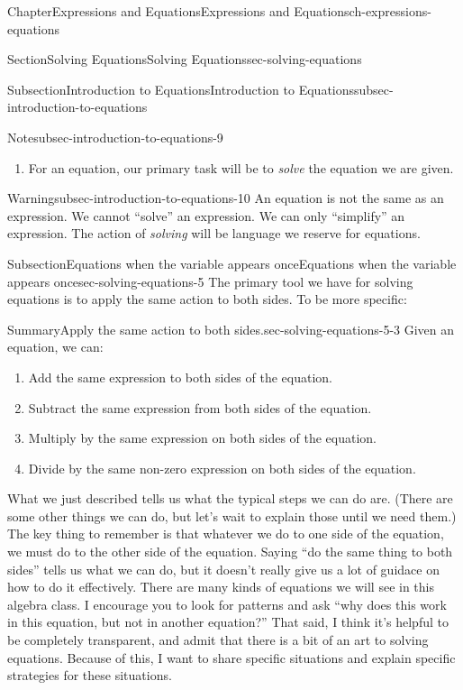 \documentclass[twoside,11pt,]{book}
\numberwithin{equation}{chapter}
\begin{document}
\begin{chapterptx}{Chapter}{Expressions and Equations}{}{Expressions and Equations}{}{}{ch-expressions-equations}
\begin{sectionptx}{Section}{Solving Equations}{}{Solving Equations}{}{}{sec-solving-equations}
\begin{subsectionptx}{Subsection}{Introduction to Equations}{}{Introduction to Equations}{}{}{subsec-introduction-to-equations}
\begin{note}{Note}{}{subsec-introduction-to-equations-9}
\begin{enumerate}
\item{}For an equation, our primary task will be to \emph{solve} the equation we are given.%
\end{enumerate}
%
\end{note}
\begin{warning}{Warning}{}{subsec-introduction-to-equations-10}%
An equation is not the same as an expression. We cannot ``solve'' an expression. We can only ``simplify'' an expression. The action of \emph{solving} will be language we reserve for equations.%
\end{warning}
\end{subsectionptx}
%
%
\typeout{************************************************}
\typeout{************************************************}
%
\begin{subsectionptx}{Subsection}{Equations when the variable appears once}{}{Equations when the variable appears once}{}{}{sec-solving-equations-5}
The primary tool we have for solving equations is to apply the same action to both sides. To be more specific:%
\begin{assemblage}{Summary}{Apply the same action to both sides.}{sec-solving-equations-5-3}%
Given an equation, we can:%
\begin{enumerate}
\item{}Add the same expression to both sides of the equation.%
\item{}Subtract the same expression from both sides of the equation.%
\item{}Multiply by the same expression on both sides of the equation.%
\item{}Divide by the same non-zero expression on both sides of the equation.%
\end{enumerate}
%
\end{assemblage}
What we just described tells us what the typical steps we can do are. (There are some other things we can do, but let's wait to explain those until we need them.) The key thing to remember is that whatever we do to one side of the equation, we must do to the other side of the equation. Saying ``do the same thing to both sides'' tells us what we can do, but it doesn't really give us a lot of guidace on how to do it effectively. There are many kinds of equations we will see in this algebra class. I encourage you to look for patterns and ask ``why does this work in this equation, but not in another equation?'' That said, I think it's helpful to be completely transparent, and admit that there is a bit of an art to solving equations. Because of this, I want to share specific situations and explain specific strategies for these situations.%

\end{subsectionptx}
\end{sectionptx}
\end{chapterptx}
\end{document}

